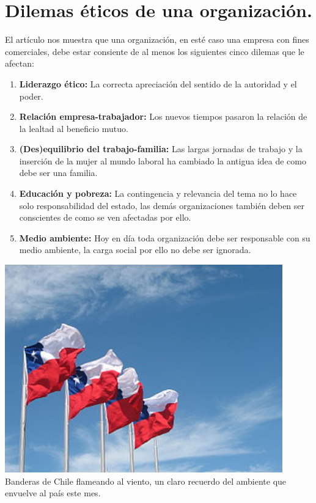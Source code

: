\documentclass[spanish, fleqn]{article}
\begin{document}
	\section{Dilemas éticos de una organización.}
	El artículo nos muestra que una organización, en esté caso una 
	empresa con fines comerciales, debe estar consiente de al menos los
	siguientes cinco dilemas que le afectan:\\
	\begin{minipage}{0.6\textwidth}
	\begin{enumerate}
		\item \textbf{Liderazgo ético:}
			La correcta apreciación del sentido de la autoridad y el poder.
		\item \textbf{Relación empresa-trabajador:}
			Los nuevos tiempos pasaron la relación de la lealtad al beneficio
			mutuo.
		\item \textbf{(Des)equilibrio del trabajo-familia:}
			Las largas jornadas de trabajo y la inserción de la mujer al mundo 
			laboral ha cambiado la antigua idea de como debe ser una familia.
		\item \textbf{Educación y pobreza:}
			La contingencia y relevancia del tema no lo hace solo
			responsabilidad del estado, las demás organizaciones también deben
			ser conscientes de como se ven afectadas por ello.
		\item \textbf{Medio ambiente:}
			Hoy en día toda organización debe ser responsable con su medio
			ambiente, la carga social por ello no debe ser ignorada.
	\end{enumerate}
	\end{minipage}
	\hfill
	\begin{minipage}{0.4\textwidth}
    	\begin{center}
			\includegraphics[width=0.9\textwidth]{chile_flag.jpg}
	    	Banderas de Chile\cite{r2} flameando al viento, un claro recuerdo
			del ambiente que envuelve al país este mes.
		\end{center}
	\end{minipage}
\end{document}
